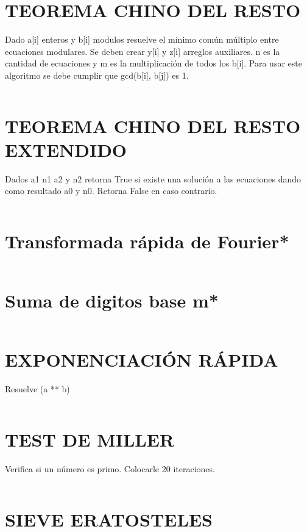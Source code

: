 \documentclass{article}
\begin{document}
\section*{TEOREMA CHINO DEL RESTO}
Dado a[i] enteros y b[i] modulos resuelve el m\'inimo com\'un m\'ultiplo entre ecuaciones modulares.
Se deben crear y[i] y z[i] arreglos auxiliares.
n es la cantidad de ecuaciones y m es la multiplicaci\'on de todos los b[i].
Para usar este algoritmo se debe cumplir que gcd(b[i], b[j]) es 1.
\inputminted[]{c++}{algorithms/CRT.cpp}

\section*{TEOREMA CHINO DEL RESTO EXTENDIDO}
Dados a1 n1 a2 y n2 retorna True si existe una soluci\'on a las ecuaciones dando como resultado a0 y n0.
Retorna False en caso contrario.
\inputminted[]{c++}{algorithms/CRTE.cpp}
\newpage


\section*{Transformada r\'apida de Fourier*}
\inputminted[]{c++}{algorithms/FFT.cpp}
\newpage

\section*{Suma de digitos base m*}
\inputminted[]{c++}{algorithms/DIGITSUM.cpp}
\newpage

\section*{EXPONENCIACI\'ON R\'APIDA}
Resuelve (a ** b) %
\inputminted[]{c++}{algorithms/EXP.cpp}


\section*{TEST DE MILLER}
Verifica si un n\'umero es primo.
Colocarle 20 iteraciones.
\inputminted[]{c++}{algorithms/MILLERTEST.cpp}
\newpage

\section*{SIEVE ERATOSTELES}
\inputminted[]{c++}{algorithms/SIEVE.cpp}
\newpage

\end{document}
